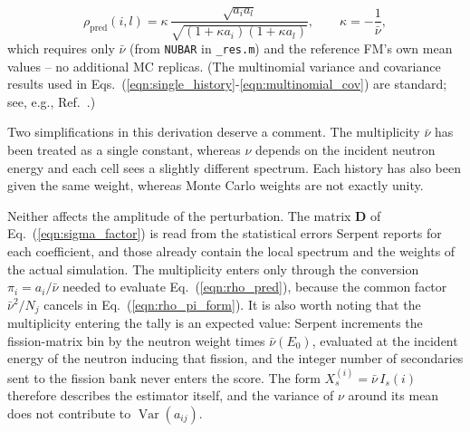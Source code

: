 \documentclass{style/nseJournal}
\begin{document}
\begin{equation}
  \rho_{\text{pred}}(i,l) = \kappa\,\frac{\sqrt{a_i a_l}}{\sqrt{(1+\kappa a_i)(1+\kappa a_l)}}, \qquad \kappa=-\frac{1}{\bar\nu},
  \label{eqn:rho_pred}
\end{equation}
which requires only $\bar\nu$ (from \texttt{NUBAR} in \texttt{\_res.m}) and the reference FM's own mean values -- no additional MC replicas. (The multinomial variance and covariance results used in Eqs.~(\ref{eqn:single_history}-\ref{eqn:multinomial_cov}) are standard; see, e.g., Ref.~\cite{CasellaBerger2002}.)

Two simplifications in this derivation deserve a comment. The multiplicity $\bar\nu$ has been treated as a single constant, whereas $\nu$ depends on the incident neutron energy and each cell sees a slightly different spectrum. Each history has also been given the same weight, whereas Monte Carlo weights are not exactly unity.

Neither affects the amplitude of the perturbation. The matrix $\mathbf{D}$ of Eq.~(\ref{eqn:sigma_factor}) is read from the statistical errors Serpent reports for each coefficient, and those already contain the local spectrum and the weights of the actual simulation. The multiplicity enters only through the conversion $\pi_i=a_i/\bar\nu$ needed to evaluate Eq.~(\ref{eqn:rho_pred}), because the common factor $\bar\nu^2/N_j$ cancels in Eq.~(\ref{eqn:rho_pi_form}). It is also worth noting that the multiplicity entering the tally is an expected value: Serpent increments the fission-matrix bin by the neutron weight times $\bar\nu(E_0)$, evaluated at the incident energy of the neutron inducing that fission, and the integer number of secondaries sent to the fission bank never enters the score. The form $X_s^{(i)}=\bar\nu\,I_s(i)$ therefore describes the estimator itself, and the variance of $\nu$ around its mean does not contribute to $\operatorname{Var}(a_{ij})$.
\end{document}
